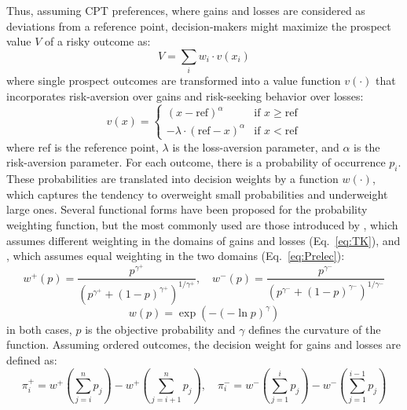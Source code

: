 \documentclass[12pt,a4paper]{article}
\begin{document}
Thus, assuming CPT preferences, where gains and losses are considered as deviations from a reference point, decision-makers might maximize the prospect value $V$ of a risky outcome as:
\begin{equation}
V = \sum_{i} w_i \cdot v(x_i)
\label{eq:CPT}
\end{equation}
where single prospect outcomes are transformed into a value function $v(\cdot)$ that incorporates risk-aversion over gains and risk-seeking behavior over losses:
\begin{equation}
v(x) = \begin{cases}
(x - \text{ref})^{\alpha} & \text{if } x \geq \text{ref} \\
-\lambda \cdot (\text{ref} - x)^{\alpha} & \text{if } x < \text{ref}
\end{cases}
\label{eq:value}
\end{equation}
where $\text{ref}$ is the reference point, $\lambda$ is the loss-aversion parameter, and $\alpha$ is the risk-aversion parameter. For each outcome, there is a probability of occurrence $p_i$. These probabilities are translated into decision weights by a function $w(\cdot)$, which captures the tendency to overweight small probabilities and underweight large ones. Several functional forms have been proposed for the probability weighting function, but the most commonly used are those introduced by \citet{TverskyKahneman1992}, which assumes different weighting in the domains of gains and losses (Eq.~\ref{eq:TK}), and \citet{Prelec1998}, which assumes equal weighting in the two domains (Eq.~\ref{eq:Prelec}):
\begin{equation}
w^{+}(p) = \frac{p^{\gamma^{+}}}{(p^{\gamma^{+}} + (1-p)^{\gamma^{+}})^{1/\gamma^{+}}}, \quad w^{-}(p) = \frac{p^{\gamma^{-}}}{(p^{\gamma^{-}} + (1-p)^{\gamma^{-}})^{1/\gamma^{-}}}
\label{eq:TK}
\end{equation}
\begin{equation}
w(p) = \exp(-(-\ln p)^{\gamma})
\label{eq:Prelec}
\end{equation}
in both cases, $p$ is the objective probability and $\gamma$ defines the curvature of the function. Assuming ordered outcomes, the decision weight for gains and losses are defined as:
\begin{equation}
\pi_i^{+} = w^{+}\left(\sum_{j=i}^{n} p_j\right) - w^{+}\left(\sum_{j=i+1}^{n} p_j\right), \quad \pi_i^{-} = w^{-}\left(\sum_{j=1}^{i} p_j\right) - w^{-}\left(\sum_{j=1}^{i-1} p_j\right)
\label{eq:weights}
\end{equation}
\end{document}
